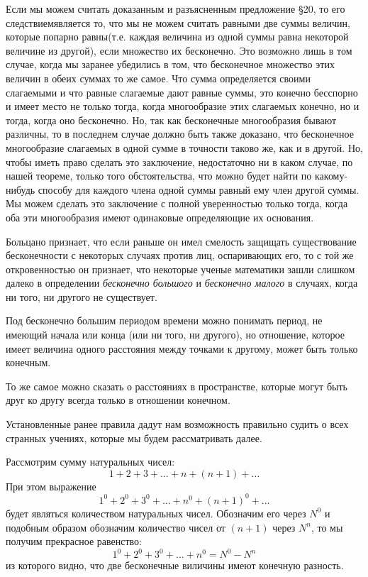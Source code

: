 \documentclass[12pt]{extarticle}
\begin{document}
Если мы можем считать доказанным и разъясненным предложение \S 20, то  его следствиемявляется то, что мы не можем считать равными две суммы величин, которые попарно равны(т.е. каждая величина из одной суммы равна некоторой величине из другой), если множество их бесконечно. 
Это возможно лишь в том случае, когда мы заранее убедились в том, что бесконечное множество этих величин в обеих суммах то же самое. Что сумма определяется своими слагаемыми и что равные слагаемые дают равные суммы, это конечно бесспорно и имеет место не только тогда, когда многообразие этих слагаемых конечно, но и тогда, когда оно бесконечно. 
Но, так как бесконечные многообразия бывают различны, то в последнем случае должно быть также доказано, что бесконечное многообразие слагаемых в одной сумме в точности таково же, как и в другой. Но, чтобы иметь право сделать это заключение, недостаточно ни в каком случае, по нашей теореме, только того обстоятельства, что можно будет найти по какому-нибудь способу для каждого члена одной суммы равный ему член другой суммы. Мы можем сделать это заключение с полной уверенностью только тогда, когда оба эти многообразия имеют одинаковые определяющие их основания.

Больцано признает, что если раньше он имел смелость защищать существование бесконечности с некоторых случаях против лиц, оспаривающих его, то с той же откровенностью он признает, что некоторые ученые математики зашли слишком далеко в определении \textit{бесконечно большого} и \textit{бесконечно малого} в случаях, когда ни того, ни другого не существует.

Под бесконечно большим периодом времени можно понимать период, не имеющий начала или конца (или ни того, ни другого), но отношение, которое имеет величина одного расстояния между точками к другому, может быть только конечным.

То же самое можно сказать о расстояниях в пространстве, которые могут быть друг ко другу всегда только в отношении конечном.

Установленные ранее правила дадут нам возможность правильно судить о всех странных учениях, которые мы будем рассматривать далее.

Рассмотрим сумму натуральных чисел:
$$
1 + 2 + 3 + \ldots + n + (n+1) + \ldots
$$
При этом выражение 
$$
1^0 + 2^0 + 3^0 + \ldots + n^0 + (n+1)^0 + \ldots
$$
будет являться количеством натуральных чисел. Обозначим его через $N^0$ и подобным образом обозначим количество чисел от $(n+1)$ через $N^n$, то мы получим прекрасное равенство: 
$$
1^0 + 2^0 + 3^0 + \ldots + n^0 = N^0 - N^n
$$
из которого видно, что две бесконечные виличины имеют конечную разность.
\end{document}
